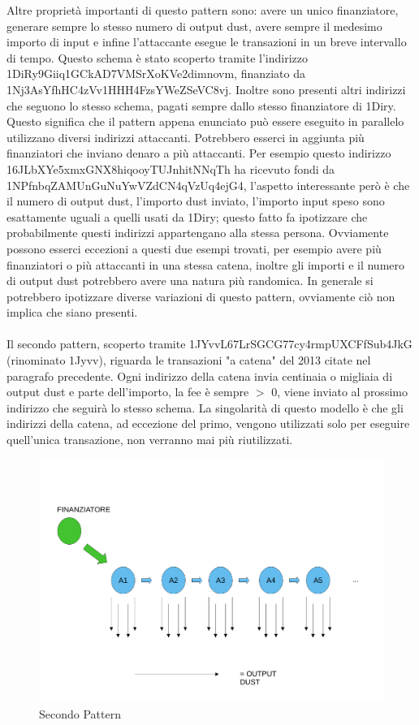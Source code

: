 Altre proprietà importanti di questo pattern sono: avere un unico finanziatore, generare sempre lo stesso numero di output dust, avere sempre il medesimo importo di input e infine l'attaccante esegue le transazioni in un breve intervallo di tempo. Questo schema è stato scoperto tramite l'indirizzo 1DiRy9Giiq1GCkAD7VMSrXoKVe2dimnovm, finanziato da 1Nj3AsYfhHC4zVv1HHH4FzsYWeZSeVC8vj. Inoltre sono presenti altri indirizzi che seguono lo stesso schema, pagati sempre dallo stesso finanziatore di 1Diry. Questo significa che il pattern appena enunciato può essere eseguito in parallelo utilizzano diversi indirizzi attaccanti. Potrebbero esserci in aggiunta più finanziatori che inviano denaro a più attaccanti. Per esempio questo indirizzo 16JLbXYe5xmxGNX8hiqooyTUJnhitNNqTh ha ricevuto fondi da 1NPfnbqZAMUnGuNuYwVZdCN4qVzUq4ejG4, l'aspetto interessante però è che il numero di output dust, l'importo dust inviato, l'importo input speso sono esattamente uguali a quelli usati da 1Diry; questo fatto fa ipotizzare che probabilmente questi indirizzi appartengano alla stessa persona. Ovviamente possono esserci eccezioni a questi due esempi trovati, per esempio avere più finanziatori o più attaccanti in una stessa catena, inoltre gli importi e il numero di output dust potrebbero avere una natura più randomica. In generale si potrebbero ipotizzare diverse variazioni di questo pattern, ovviamente ciò non implica che siano presenti.\\\\
Il secondo pattern, scoperto tramite 1JYvvL67LrSGCG77cy4rmpUXCFfSub4JkG (rinominato 1Jyvv), riguarda le transazioni "a catena" del 2013 citate nel paragrafo precedente. Ogni indirizzo della catena invia centinaia o migliaia di output dust e parte dell'importo, la fee è sempre $>$ 0, viene inviato al prossimo indirizzo che seguirà lo stesso schema. La singolarità di questo modello è che gli indirizzi della catena, ad eccezione del primo, vengono utilizzati solo per eseguire quell'unica transazione, non verranno mai più riutilizzati.
\begin{figure}[h!]
    \centering
    \includegraphics[scale=0.4]{Images/dust_attack2.pdf}
    \caption{Secondo Pattern}
    \label{fig:schema2}
\end{figure}

